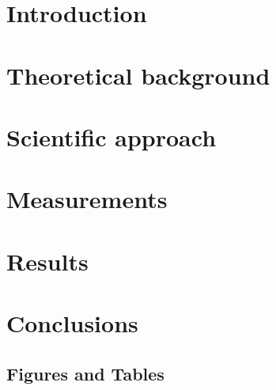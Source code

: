 \documentclass[conference]{IEEEtran}
\begin{document}
\section{Introduction}



\section{Theoretical background}







\section{Scientific approach}



\section{Measurements}









\section{Results}







\section{Conclusions}


\pagebreak
\subsection{Figures and Tables}

\listoffigures
\listoftables

\printbibliography
\end{document}
